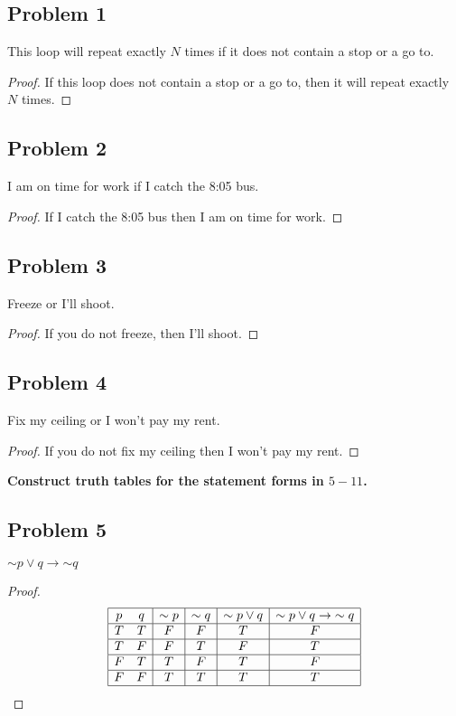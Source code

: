 \documentclass[14pt]{extarticle}
\begin{document}
\subsection{Problem 1}
This loop will repeat exactly $N$ times if it does not contain a stop or a go
to.

\begin{proof}
If this loop does not contain a stop or a go to, then it will repeat exactly $N$
times.
\end{proof}

\subsection{Problem 2}
I am on time for work if I catch the 8:05 bus.

\begin{proof}
If I catch the 8:05 bus then I am on time for work.
\end{proof}

\subsection{Problem 3}
Freeze or I’ll shoot.

\begin{proof}
If you do not freeze, then I’ll shoot.
\end{proof}

\subsection{Problem 4}
Fix my ceiling or I won’t pay my rent.

\begin{proof}
If you do not fix my ceiling then I won't pay my rent.
\end{proof}

{\bf Construct truth tables for the statement forms in $5-11$.}

\subsection{Problem 5}
${\sim p} \vee q \to {\sim q}$

\begin{proof}
$$
\begin{array}{|cc|c|c|c|c|}
\hline
p & q & {\sim p} & {\sim q} & {\sim p} \vee q & {\sim p} \vee q \to {\sim q} \\
\hline
T & T & F & F & T & F \\
\hline
T & F & F & T & F & T \\
\hline
F & T & T & F & T & F \\
\hline
F & F & T & T & T & T \\
\hline
\end{array}
$$
\end{proof}
\end{document}
